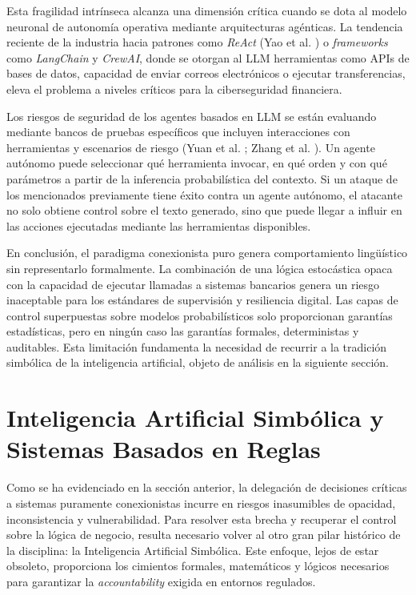 \documentclass[12pt,a4paper]{report}
\begin{document}
Esta fragilidad intrínseca alcanza una dimensión crítica cuando se dota al modelo neuronal de autonomía operativa mediante arquitecturas agénticas. La tendencia reciente de la industria hacia patrones como \textit{ReAct} (Yao et al. \cite{yao2023react}) o \textit{frameworks} como \textit{LangChain} y \textit{CrewAI}, donde se otorgan al LLM herramientas como APIs de bases de datos, capacidad de enviar correos electrónicos o ejecutar transferencias, eleva el problema a niveles críticos para la ciberseguridad financiera.

Los riesgos de seguridad de los agentes basados en LLM se están evaluando mediante bancos de pruebas específicos que incluyen interacciones con herramientas y escenarios de riesgo (Yuan et al. \cite{yuan2024rjudge}; Zhang et al. \cite{zhang2024agentsafetybench}). Un agente autónomo puede seleccionar qué herramienta invocar, en qué orden y con qué parámetros a partir de la inferencia probabilística del contexto. Si un ataque de los mencionados previamente tiene éxito contra un agente autónomo, el atacante no solo obtiene control sobre el texto generado, sino que puede llegar a influir en las acciones ejecutadas mediante las herramientas disponibles.

En conclusión, el paradigma conexionista puro genera comportamiento lingüístico sin representarlo formalmente. La combinación de una lógica estocástica opaca con la capacidad de ejecutar llamadas a sistemas bancarios genera un riesgo inaceptable para los estándares de supervisión y resiliencia digital. Las capas de control superpuestas sobre modelos probabilísticos solo proporcionan garantías estadísticas, pero en ningún caso las garantías formales, deterministas y auditables. Esta limitación fundamenta la necesidad de recurrir a la tradición simbólica de la inteligencia artificial, objeto de análisis en la siguiente sección.

\section{Inteligencia Artificial Simbólica y Sistemas Basados en Reglas}

Como se ha evidenciado en la sección anterior, la delegación de decisiones críticas a sistemas puramente conexionistas incurre en riesgos inasumibles de opacidad, inconsistencia y vulnerabilidad. Para resolver esta brecha y recuperar el control sobre la lógica de negocio, resulta necesario volver al otro gran pilar histórico de la disciplina: la Inteligencia Artificial Simbólica. Este enfoque, lejos de estar obsoleto, proporciona los cimientos formales, matemáticos y lógicos necesarios para garantizar la \textit{accountability} exigida en entornos regulados.
\end{document}
